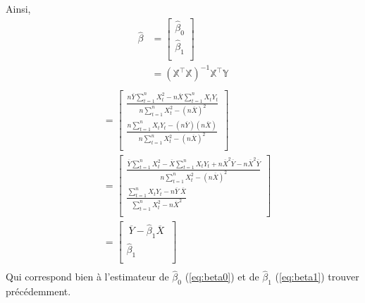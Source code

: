 \documentclass[11pt,french]{report}
\begin{document}
Ainsi,
\begin{align*}
\hat{\beta} &= 
\begin{bmatrix} 
\hat{\beta}_0 \\
\hat{\beta}_1 \\
\end{bmatrix} \\
&= (\mathbb{X}^\intercal\mathbb{X})^{-1}\mathbb{X}^\intercal\mathbb{Y} \\
\end{align*}
\begin{align*}
&= 
\begin{bmatrix} 
\frac{n \overline{Y} \displaystyle\sum_{t=1}^n X_t^2 - n \overline{X} \displaystyle\sum_{t=1}^n X_tY_t}{n \displaystyle\sum_{t=1}^n X_t^2 - (n \overline{X})^2} \\
\frac{n\displaystyle\sum_{t=1}^n X_tY_t - (n \overline{Y})(n \overline{X}) }{n \displaystyle\sum_{t=1}^n X_t^2 - (n \overline{X})^2} \\
\end{bmatrix} \\
&=
\begin{bmatrix} 
\frac{\overline{Y} \displaystyle\sum_{t=1}^n X_t^2 - \overline{X} \displaystyle\sum_{t=1}^n X_tY_t + n\overline{X}^2\overline{Y} - n\overline{X}^2\overline{Y}}{n \displaystyle\sum_{t=1}^n X_t^2 - (n \overline{X})^2} \\
\frac{\displaystyle\sum_{t=1}^n X_tY_t - n\overline{Y}\ \overline{X}}{\displaystyle\sum_{t=1}^n X_t^2 - n \overline{X}^2} \\
\end{bmatrix} \\
&=
\begin{bmatrix} 
\ \displaystyle{\overline{Y}} - \hat{\beta}_1\displaystyle{\overline{X} \ }\\
\hat{\beta}_1 \\
\end{bmatrix} \\
\end{align*}
Qui correspond bien à l'estimateur de $\hat{\beta}_0$ (\ref{eq:beta0}) et de $\hat{\beta}_1$ (\ref{eq:beta1}) trouver précédemment.
\end{document}
